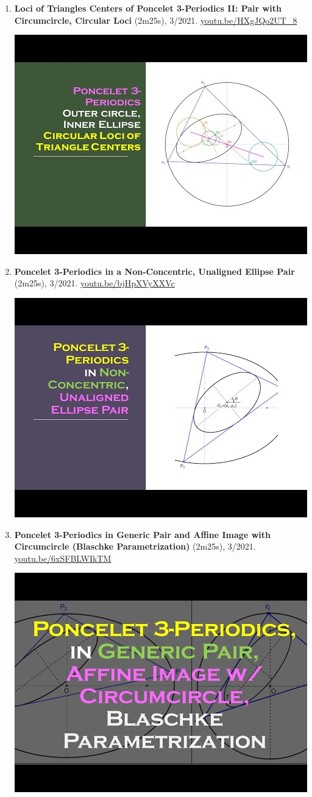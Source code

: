 \documentclass[12pt]{article}
\begin{document}
\begin{enumerate}[resume]
% 
\item \textbf{Loci of Triangles Centers of Poncelet 3-Periodics II: Pair with Circumcircle, Circular Loci} (2m25s), 3/2021. \href{https://youtu.be/HXgJQo2UT_8}{\url{youtu.be/HXgJQo2UT\_8}}
\begin{center}\includegraphics[width=.5\textwidth]{pics/HXgJQo2UT_8.jpg}\end{center}
% 
\item \textbf{Poncelet 3-Periodics in a Non-Concentric, Unaligned Ellipse Pair} (2m25s), 3/2021. \href{https://youtu.be/bjHpXVyXXVc}{\url{youtu.be/bjHpXVyXXVc}}
\begin{center}\includegraphics[width=.5\textwidth]{pics/bjHpXVyXXVc.jpg}\end{center}
% 
\item \textbf{Poncelet 3-Periodics in Generic Pair and Affine Image with Circumcircle (Blaschke Parametrization)} (2m25s), 3/2021. \href{https://youtu.be/6xSFBLWIkTM}{\url{youtu.be/6xSFBLWIkTM}}
\begin{center}\includegraphics[width=.5\textwidth]{pics/6xSFBLWIkTM.jpg}\end{center}

\end{enumerate}
\end{document}
